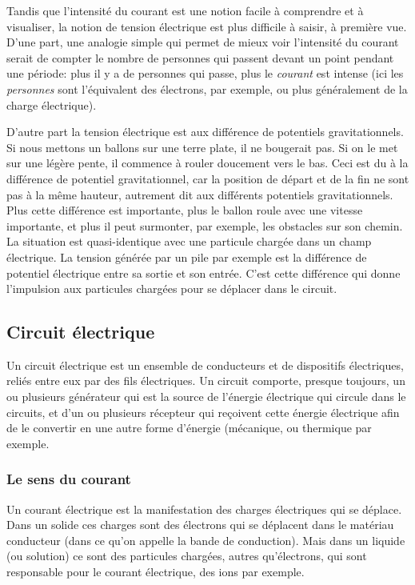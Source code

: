 \documentclass[11pt,a4paper]{article}
\begin{document}
\begin{rmrq}
Tandis que l'intensité du courant est une notion facile à comprendre et à visualiser, la notion de tension électrique est plus difficile à saisir, à première vue. D'une part, une analogie simple qui permet de mieux voir l'intensité du courant serait de compter le nombre de personnes qui passent devant un point pendant une période: plus il y a de personnes qui passe, plus le \textit{courant} est intense (ici les \textit{personnes} sont l'équivalent des électrons, par exemple, ou plus généralement de la charge électrique). 

D'autre part la tension électrique est aux différence de potentiels gravitationnels. Si nous mettons un ballons sur une terre plate, il ne bougerait pas. Si on le met sur une légère pente, il commence à rouler doucement vers le bas. Ceci est du à la différence de potentiel gravitationnel, car la position de départ et de la fin ne sont pas à la même hauteur, autrement dit aux différents potentiels gravitationnels. Plus cette différence est importante, plus le ballon roule avec une vitesse importante, et plus il peut surmonter, par exemple, les obstacles sur son chemin. La situation est quasi-identique avec une particule chargée dans un champ électrique. La tension générée par un pile par exemple est la différence de potentiel électrique entre sa sortie et son entrée. C'est cette différence qui donne l'impulsion aux particules chargées pour se déplacer dans le circuit.  
\end{rmrq}

\endgroup

\subsection{Circuit électrique}
Un circuit électrique est un ensemble de conducteurs et de dispositifs électriques, reliés entre eux par des fils électriques. Un circuit comporte, presque toujours, un ou plusieurs générateur qui est la source de l'énergie électrique qui circule dans le circuits, et d'un ou plusieurs récepteur qui reçoivent cette énergie électrique afin de le convertir en une autre forme d'énergie (mécanique, ou thermique par exemple. 

\subsubsection*{Le sens du courant}

Un courant électrique est la manifestation des charges électriques qui se déplace. Dans un solide ces charges sont des électrons qui se déplacent dans le matériau conducteur (dans ce qu'on appelle la bande de conduction). Mais dans un liquide (ou solution) ce sont des particules chargées, autres qu'électrons, qui sont responsable pour le courant électrique, des ions par exemple.
\end{document}
